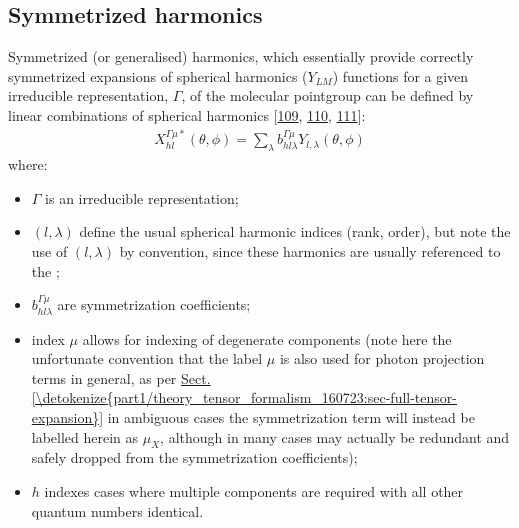 \documentclass[letterpaper,table,10pt,english]{jupyterBook}
\begin{document}
\subsection{Symmetrized harmonics}
\label{\detokenize{part1/theory_observables_intro_100723:symmetrized-harmonics}}\label{\detokenize{part1/theory_observables_intro_100723:sec-theory-sym-harm-into}}
\sphinxAtStartPar
Symmetrized (or generalised) harmonics, which essentially provide correctly symmetrized expansions of spherical harmonics (\(Y_{LM}\)) functions for a given irreducible representation, \(\Gamma\), of the molecular point\sphinxhyphen{}group can be defined by linear combinations of spherical harmonics {[}\hyperlink{cite.backmatter/bibliography:id498}{109}, \hyperlink{cite.backmatter/bibliography:id499}{110}, \hyperlink{cite.backmatter/bibliography:id545}{111}{]}:
\begin{equation}\label{equation:part1/theory_observables_intro_100723:eq:symHarm-defn}
\begin{split}
X_{hl}^{\Gamma\mu*}(\theta,\phi)=\sum_{\lambda}b_{hl\lambda}^{\Gamma\mu}Y_{l,\lambda}(\theta,\phi)
\end{split}
\end{equation}
\sphinxAtStartPar
where:
\begin{itemize}
\item {} 
\sphinxAtStartPar
\(\Gamma\) is an irreducible representation;

\item {} 
\sphinxAtStartPar
\((l, \lambda)\) define the usual spherical harmonic indices (rank, order), but note the use of \((l, \lambda)\) by convention, since these harmonics are usually referenced to the {\hyperref[\detokenize{backmatter/glossary:term-MF}]{}};

\item {} 
\sphinxAtStartPar
\(b_{hl\lambda}^{\Gamma\mu}\) are symmetrization coefficients;

\item {} 
\sphinxAtStartPar
index \(\mu\) allows for indexing of degenerate components (note here the unfortunate convention that the label \(\mu\) is also used for photon projection terms in general, as per \hyperref[\detokenize{part1/theory_tensor_formalism_160723:sec-full-tensor-expansion}]{Sect.\@ \ref{\detokenize{part1/theory_tensor_formalism_160723:sec-full-tensor-expansion}}} \sphinxhyphen{} in ambiguous cases the symmetrization term will instead be labelled herein as \(\mu_X\), although in many cases may actually be redundant and safely dropped from the symmetrization coefficients);

\item {} 
\sphinxAtStartPar
\(h\) indexes cases where multiple components are required with all other quantum numbers identical.

\end{itemize}
\end{document}

